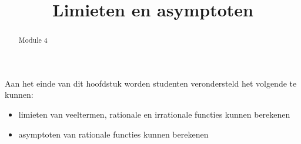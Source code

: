 \documentclass{ximera}
\title{Limieten en asymptoten}
\begin{document}
\begin{abstract}
Module 4 %
\end{abstract}

\maketitle

\begin{sectionOutcomes}

Aan het einde van dit hoofdstuk worden studenten verondersteld het volgende te kunnen:

\begin{itemize}
\item limieten van veeltermen, rationale en irrationale functies kunnen berekenen
\item asymptoten van rationale functies kunnen berekenen
\end{itemize}

\end{sectionOutcomes}

\end{document}
